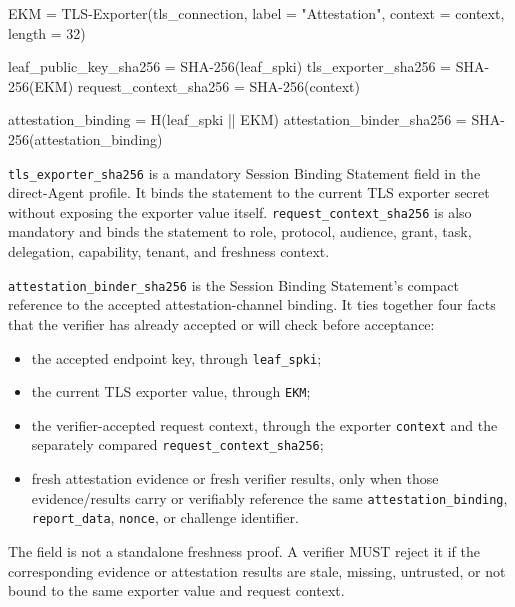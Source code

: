 \documentclass[
]{article}
\newenvironment{Shaded}{}{}
\newcommand{\NormalTok}[1]{#1}
\providecommand{\tightlist}{%
  \setlength{\itemsep}{0pt}\setlength{\parskip}{0pt}}
\begin{document}
\begin{Shaded}
\begin{Highlighting}[]
\NormalTok{EKM = TLS{-}Exporter(tls_connection,}
\NormalTok{                   label = "Attestation",}
\NormalTok{                   context = context,}
\NormalTok{                   length = 32)}

\NormalTok{leaf_public_key_sha256     = SHA{-}256(leaf_spki)}
\NormalTok{tls_exporter_sha256        = SHA{-}256(EKM)}
\NormalTok{request_context_sha256    = SHA{-}256(context)}

\NormalTok{attestation_binding        = H(leaf_spki || EKM)}
\NormalTok{attestation_binder_sha256 = SHA{-}256(attestation_binding)}
\end{Highlighting}
\end{Shaded}

\texttt{tls\_exporter\_sha256} is a mandatory Session Binding Statement
field in the direct-Agent profile. It binds the statement to the current
TLS exporter secret without exposing the exporter value itself.
\texttt{request\_context\_sha256} is also mandatory and binds the
statement to role, protocol, audience, grant, task, delegation,
capability, tenant, and freshness context.

\texttt{attestation\_binder\_sha256} is the Session Binding
Statement's compact reference to the accepted attestation-channel
binding. It ties together four facts that the verifier has already
accepted or will check before acceptance:

\begin{itemize}
\tightlist
\item
  the accepted endpoint key, through \texttt{leaf\_spki};
\item
  the current TLS exporter value, through \texttt{EKM};
\item
  the verifier-accepted request context, through the exporter
  \texttt{context} and the separately compared
  \texttt{request\_context\_sha256};
\item
  fresh attestation evidence or fresh verifier results, only when those
  evidence/results carry or verifiably reference the same
  \texttt{attestation\_binding}, \texttt{report\_data}, \texttt{nonce},
  or challenge identifier.
\end{itemize}

The field is not a standalone freshness proof. A verifier MUST reject it
if the corresponding evidence or attestation results are stale, missing,
untrusted, or not bound to the same exporter value and request context.
\end{document}
